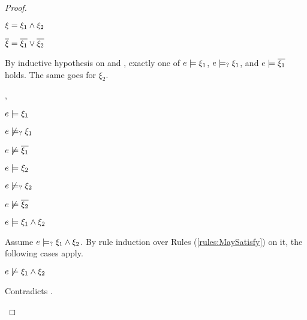 \begin{proof}
\begin{byCases}
\item[\text{(\ref{rule:CTAnd})}]
    \begin{pfsteps*}
    \item $\xi=\xi_1 \wedge \xi_2$ 
    \item $\overline{\xi}=\overline{\xi_1} \vee \overline{\xi_2}$ 
    \end{pfsteps*}
    By inductive hypothesis on  and , exactly one of $e \models \xi_1$, $e \models_{?} \xi_1$, and $e \models \overline{\xi_1}$ holds. The same goes for $\xi_2$.
    \begin{byCases}
    \item[\csatisfy{e}{\xi_1},\csatisfy{e}{\xi_2}]
        \begin{pfsteps*}
        \item $e \models \xi_1$  
        \item $e \not\models_{?} \xi_1$  
        \item $e \not\models \overline{\xi_1}$  
        \item $e \models \xi_2$  
        \item $e \not\models_{?} \xi_2$  
        \item $e \not\models \overline{\xi_2}$  
        \item $e \models \xi_1 \wedge \xi_2$  
        \end{pfsteps*}
        Assume $e \models_{?} \xi_1 \wedge \xi_2$. By rule induction over Rules (\ref{rules:MaySatisfy}) on it, the following cases apply.
        \begin{byCases}
        \item[\text{(\ref{rule:CMSExpEHole}),(\ref{rule:CMSExpHole}),(\ref{rule:CMSAp}),(\ref{rule:CMSPrl}),(\ref{rule:CMSPrr}),(\ref{rule:CMSMatch})}]
            \begin{pfsteps*}
            \item $e \not\models \xi_1 \wedge \xi_2$  
            \end{pfsteps*}
            Contradicts .

\end{byCases}
\end{byCases}
\end{byCases}
\end{proof}

